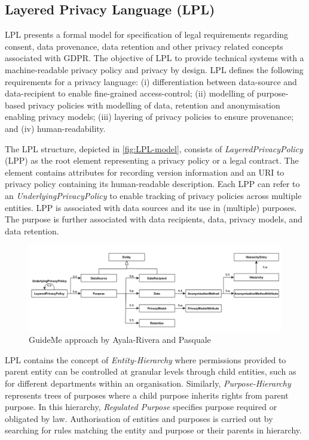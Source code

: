 \subsection*{Layered Privacy Language (LPL)}
LPL \cite{gerl_lpl_2018} presents a formal model for specification of legal requirements regarding consent, data provenance, data retention and other privacy related concepts associated with GDPR. The objective of LPL to provide technical systems with a machine-readable privacy policy and privacy by design. 
LPL defines the following requirements for a privacy language: (i) differentiation between data-source and data-recipient to enable fine-grained access-control; (ii) modelling of purpose-based privacy policies with modelling of data, retention and anonymisation enabling privacy models; (iii) layering of privacy policies to ensure provenance; and (iv) human-readability.

The LPL structure, depicted in \autoref{fig:LPL-model}, consists of \textit{LayeredPrivacyPolicy} (LPP) as the root element representing a privacy policy or a legal contract. The element contains attributes for recording version information and an URI to privacy policy containing its human-readable description. Each LPP can refer to an \textit{UnderlyingPrivacyPolicy} to enable tracking of privacy policies across multiple entities.
LPP is associated with data sources and its use in (multiple) purposes. The purpose is further associated with data recipients, data, privacy models, and data retention.
\begin{figure}[htbp]
    \centering
    \includegraphics[width=\linewidth]{img/LPL_model.png}
    \caption{GuideMe approach by Ayala-Rivera and Pasquale \cite{gerl_lpl_2018}}
    \label{fig:LPL-model}
\end{figure}

LPL contains the concept of \textit{Entity-Hierarchy} where permissions provided to parent entity can be controlled at granular levels through child entities, such as for different departments within an organisation. Similarly, \textit{Purpose-Hierarchy} represents trees of purposes where a child purpose inherits rights from parent purpose. In this hierarchy, \textit{Regulated Purpose} specifies purpose required or obligated by law.
Authorisation of entities and purposes is carried out by searching for rules matching the entity and purpose or their parents in hierarchy. 

